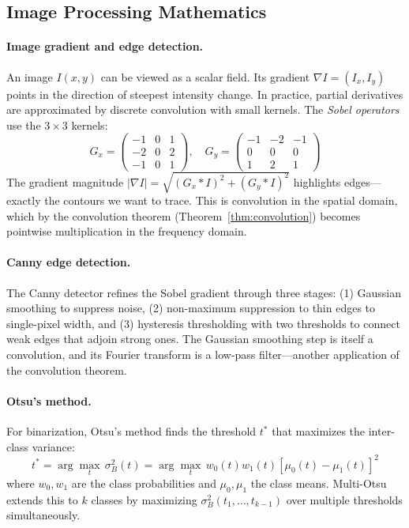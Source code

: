\documentclass[12pt,a4paper]{report}
\theoremstyle{thms}
\theoremstyle{defns}
\begin{document}
\subsection{Image Processing Mathematics}

\paragraph{Image gradient and edge detection.} An image $I(x, y)$ can be viewed as a scalar field. Its gradient $\nabla I = (I_x, I_y)$ points in the direction of steepest intensity change. In practice, partial derivatives are approximated by discrete convolution with small kernels. The \textit{Sobel operators} use the $3 \times 3$ kernels:
\begin{equation}
    G_x = \begin{pmatrix} -1 & 0 & 1 \\ -2 & 0 & 2 \\ -1 & 0 & 1 \end{pmatrix}, \quad G_y = \begin{pmatrix} -1 & -2 & -1 \\ 0 & 0 & 0 \\ 1 & 2 & 1 \end{pmatrix}
\end{equation}
The gradient magnitude $|\nabla I| = \sqrt{(G_x * I)^2 + (G_y * I)^2}$ highlights edges—exactly the contours we want to trace. This is convolution in the spatial domain, which by the convolution theorem (Theorem~\ref{thm:convolution}) becomes pointwise multiplication in the frequency domain.

\paragraph{Canny edge detection.} The Canny detector refines the Sobel gradient through three stages: (1) Gaussian smoothing to suppress noise, (2) non-maximum suppression to thin edges to single-pixel width, and (3) hysteresis thresholding with two thresholds to connect weak edges that adjoin strong ones. The Gaussian smoothing step is itself a convolution, and its Fourier transform is a low-pass filter—another application of the convolution theorem.

\paragraph{Otsu's method.} For binarization, Otsu's method \cite{otsu_threshold} finds the threshold $t^*$ that maximizes the inter-class variance:
\begin{equation}
    t^* = \arg\max_t \, \sigma_B^2(t) = \arg\max_t \, w_0(t)w_1(t)[\mu_0(t) - \mu_1(t)]^2
\end{equation}
where $w_0, w_1$ are the class probabilities and $\mu_0, \mu_1$ the class means. Multi-Otsu extends this to $k$ classes by maximizing $\sigma_B^2(t_1, \ldots, t_{k-1})$ over multiple thresholds simultaneously.
\end{document}
